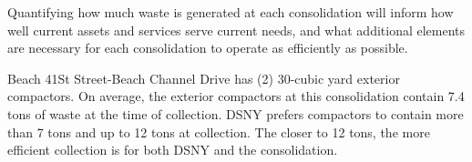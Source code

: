 
    Quantifying how much waste is generated at each consolidation will inform how well current assets and services serve current needs, and what additional elements are necessary for each consolidation to operate as efficiently as possible.
    
    Beach 41St Street-Beach Channel Drive has (2) 30-cubic yard exterior compactors. On average, the exterior compactors at this consolidation contain 7.4 tons of waste at the time of collection. DSNY prefers compactors to contain more than 7 tons and up to 12 tons at collection. The closer to 12 tons, the more efficient collection is for both DSNY and the consolidation.